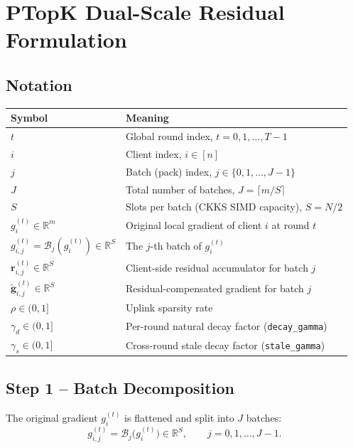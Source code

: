 \documentclass{article}
\begin{document}
\section*{PTopK Dual-Scale Residual Formulation}

\subsection*{Notation}

\begin{tabular}{ll}
\toprule
Symbol & Meaning \\
\midrule
$t$ & Global round index, $t = 0, 1, \dots, T-1$ \\
$i$ & Client index, $i \in [n]$ \\
$j$ & Batch (pack) index, $j \in \{0, 1, \dots, J-1\}$ \\
$J$ & Total number of batches, $J = \lceil m / S \rceil$ \\
$S$ & Slots per batch (CKKS SIMD capacity), $S = N/2$ \\
$g_i^{(t)} \in \mathbb{R}^m$ & Original local gradient of client $i$ at round $t$ \\
$g_{i,j}^{(t)} = \mathcal{B}_j(g_i^{(t)}) \in \mathbb{R}^S$ & The $j$-th batch of $g_i^{(t)}$ \\
$\mathbf{r}_{i,j}^{(t)} \in \mathbb{R}^S$ & Client-side residual accumulator for batch $j$ \\
$\tilde{\mathbf{g}}_{i,j}^{(t)} \in \mathbb{R}^S$ & Residual-compensated gradient for batch $j$ \\
$\rho \in (0,1]$ & Uplink sparsity rate \\
$\gamma_d \in (0,1]$ & Per-round natural decay factor (\texttt{decay\_gamma}) \\
$\gamma_s \in (0,1]$ & Cross-round stale decay factor (\texttt{stale\_gamma}) \\
\bottomrule
\end{tabular}

\vspace{1em}

\subsection*{Step 1 -- Batch Decomposition}

The original gradient $g_i^{(t)}$ is flattened and split into $J$ batches:
%
\begin{equation}
g_{i,j}^{(t)} = \mathcal{B}_j\bigl(g_i^{(t)}\bigr) \in \mathbb{R}^S, \qquad j = 0, 1, \dots, J-1.
\end{equation}
\end{document}
